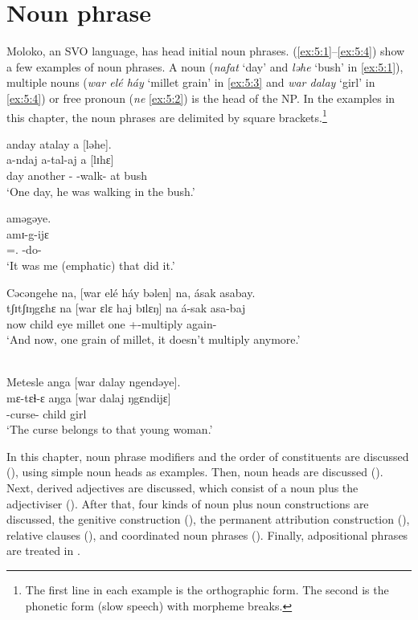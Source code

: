 \chapter[Noun phrase]{Noun phrase}\label{chap:5}
\hypertarget{RefHeading1211561525720847}{}
Moloko, an SVO language, has head initial noun phrases.  (\ref{ex:5:1}--\ref{ex:5:4}) show a few examples of noun phrases.  A noun (\textit{nafat}  ‘day’ and \textit{ləhe} ‘bush’ in \ref{ex:5:1}), multiple nouns (\textit{war elé háy} ‘millet grain’ in \ref{ex:5:3} and \textit{war dalay} ‘girl’ in \ref{ex:5:4}) or free pronoun (\textit{ne} {\oneS} \ref{ex:5:2}) is the head of the NP. In the examples in this chapter, the noun phrases are delimited by square brackets.\footnote{The first line in each example is the orthographic form. The second is the phonetic form (slow speech) with morpheme breaks.} 

\ea \label{ex:5:1}  anday  atalay   a  [ləhe].\\
  a-ndaj a-tal-aj a  [lɪhɛ]\\
      day  another  \SSS-{\PRG}    \SSS-walk-{\CL}  at  bush\\
\glt  ‘One day, he was walking in the bush.’
\z

\ea \label{ex:5:2}\relax 
 [Ne  ahan]  aməgəye.\\
\gll      [nɛ  =ahaŋ] amɪ-g-ijɛ\\
      {\oneS}  =\SSS.{\POSS}  {\DEP}-do-{\CL}\\
\glt  ‘It was me (emphatic) that did it.’ 
\z

\ea \label{ex:5:3} 
 Cəcəngehe  na,  [war  elé  háy  bəlen]   na,  ásak  asabay.\\
\gll      tʃɪtʃɪŋgɛhɛ  na [war   ɛlɛ  haj   bɪlɛŋ] na  á-sak  asa-baj\\
      now  {\PSP}    child  eye  millet  one  {\PSP}  \SSS+{\IFV}-multiply again-{\NEG}\\
\glt  ‘And now, one grain of millet, it doesn’t multiply anymore.’
\z

\ea \label{ex:5:4}\\ 
  Metesle   anga  [war  dalay  ngendəye].\\
\gll       mɛ-tɛɬ-ɛ aŋga  [war  dalaj  ŋgɛndijɛ]\\
      {\NOM}-curse-{\CL}  {\POSS}  child  girl  {\DEM}\\
\glt  ‘The curse belongs to that young woman.’
\z

In this chapter, noun phrase modifiers and the order of constituents are discussed (), using simple noun heads as examples. Then, noun heads are discussed (). Next, derived adjectives are discussed, which consist of a noun plus the adjectiviser (). After that, four kinds of noun plus noun constructions are discussed, the genitive construction (), the permanent attribution construction (), relative clauses (), and coordinated noun phrases (). Finally, adpositional phrases are treated in .

